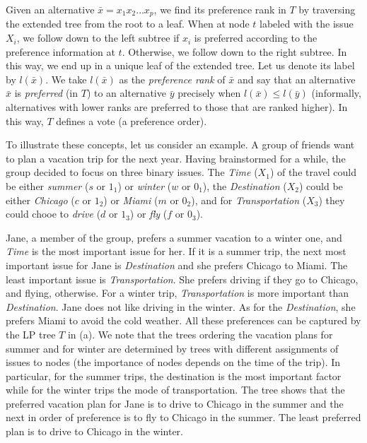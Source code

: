 Given an alternative $\bar{x}=x_1x_2\ldots x_p$, we find its 
preference rank in $T$ by traversing the extended tree from the 
root to a leaf. When at node $t$ labeled with the issue $X_i$, we follow 
down to the left subtree if $x_i$ is preferred according to the preference 
information at $t$. Otherwise, we follow down to the right subtree. In 
this way, we end up in a unique leaf of the extended tree. Let us 
denote its label by $l(\bar{x})$. We take $l(\bar{x})$ as the 
\emph{preference rank} of $\bar{x}$ and say that an alternative $\bar{x}$ 
is \emph{preferred} (in $T$) to an alternative $\bar{y}$ precisely when 
$l(\bar{x})\leq l(\bar{y})$ (informally, alternatives with lower ranks
are preferred to those that are ranked higher). In this way, $T$ defines 
a vote (a preference order). 

To illustrate these concepts, let us consider an example. A group 
of friends want to plan a vacation trip for the next year. Having 
brainstormed for a while, the group decided to focus 
on three binary issues. The \textit{Time} ($X_1$) of the travel could be 
either \textit{summer} ($s$ or $1_1$) or \textit{winter} ($w$ or $0_1$), 
the \textit{Destination} ($X_2$) could be either \textit{Chicago} 
($c$ or $1_2$) or \textit{Miami} ($m$ or $0_2$), and for 
\textit{Transportation} ($X_3$) they could chooe to \textit{drive} 
($d$ or $1_3$) or \textit{fly} ($f$ or $0_3$).
      
Jane, a member of the group, prefers a summer vacation to a winter one,
and \textit{Time} is the most important issue for her. If it is a summer
trip, the next most important issue for Jane is \textit{Destination} 
and she prefers Chicago to Miami. The least important issue is 
\textit{Transportation}. She prefers driving if they go to Chicago, and
flying, otherwise. For a winter trip, \textit{Transportation} is more
important than \textit{Destination}. Jane does not like driving in the 
winter. As for the \textit{Destination}, she prefers Miami to 
avoid the cold weather. All these preferences can be captured by 
the LP tree $T$ in (a). We note that the 
trees ordering the vacation plans for summer and for winter are 
determined by trees with different assignments of issues to nodes (the 
importance of nodes depends on the time of the trip). In particular,
for the summer trips, the destination is the most important factor while 
for the winter trips the mode of transportation. The tree shows that
the preferred vacation plan for Jane is to drive to Chicago in 
the summer and the next in order of preference is to fly to Chicago in 
the summer. The least preferred plan is to drive to Chicago in the winter.

